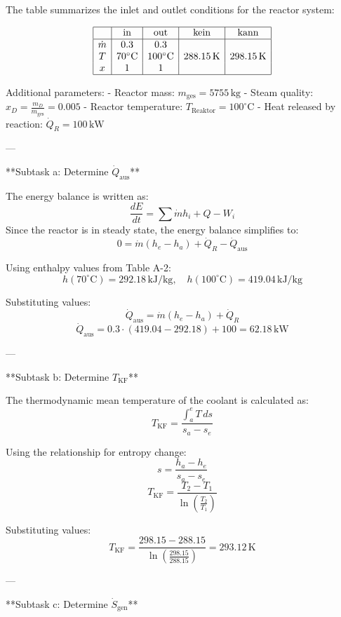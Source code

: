 The table summarizes the inlet and outlet conditions for the reactor system:  

\[
\begin{array}{|c|c|c|c|c|}
\hline
 & \text{in} & \text{out} & \text{kein} & \text{kann} \\
\hline
\dot{m} & 0.3 & 0.3 & & \\
T & 70^\circ\text{C} & 100^\circ\text{C} & 288.15 \, \text{K} & 298.15 \, \text{K} \\
x & 1 & 1 & & \\
\hline
\end{array}
\]

Additional parameters:  
- Reactor mass: \( m_{\text{ges}} = 5755 \, \text{kg} \)  
- Steam quality: \( x_D = \frac{m_D}{m_{\text{ges}}} = 0.005 \)  
- Reactor temperature: \( T_{\text{Reaktor}} = 100^\circ\text{C} \)  
- Heat released by reaction: \( \dot{Q}_R = 100 \, \text{kW} \)  

---

**Subtask a: Determine \( \dot{Q}_{\text{aus}} \)**  

The energy balance is written as:  
\[
\frac{dE}{dt} = \sum \dot{m} h_i + Q - W_i
\]  
Since the reactor is in steady state, the energy balance simplifies to:  
\[
0 = \dot{m} (h_e - h_a) + \dot{Q}_R - \dot{Q}_{\text{aus}}
\]  

Using enthalpy values from Table A-2:  
\[
h(70^\circ\text{C}) = 292.18 \, \text{kJ/kg}, \quad h(100^\circ\text{C}) = 419.04 \, \text{kJ/kg}
\]  

Substituting values:  
\[
\dot{Q}_{\text{aus}} = \dot{m} (h_e - h_a) + \dot{Q}_R
\]  
\[
\dot{Q}_{\text{aus}} = 0.3 \cdot (419.04 - 292.18) + 100 = 62.18 \, \text{kW}
\]  

---

**Subtask b: Determine \( T_{\text{KF}} \)**  

The thermodynamic mean temperature of the coolant is calculated as:  
\[
T_{\text{KF}} = \frac{\int_a^e T \, ds}{s_a - s_e}
\]  

Using the relationship for entropy change:  
\[
s = \frac{h_a - h_e}{s_a - s_e}
\]  
\[
T_{\text{KF}} = \frac{T_2 - T_1}{\ln \left( \frac{T_2}{T_1} \right)}
\]  

Substituting values:  
\[
T_{\text{KF}} = \frac{298.15 - 288.15}{\ln \left( \frac{298.15}{288.15} \right)} = 293.12 \, \text{K}
\]  

---

**Subtask c: Determine \( \dot{S}_{\text{gen}} \)**  

